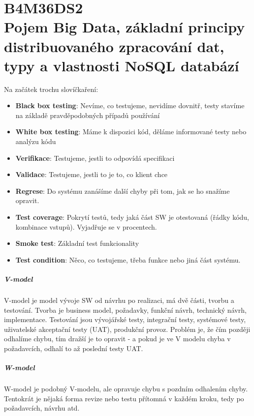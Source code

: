 \chapter[Databáze 2]{B4M36DS2 \\[1ex]\Large{Pojem Big Data, základní principy distribuovaného zpracování dat, typy a vlastnosti NoSQL databází}}

Na začátek trochu slovíčkaření:

\begin{itemize}
\item \textbf{Black box testing}: Nevíme, co testujeme, nevidíme dovnitř, testy stavíme na základě pravděpodobných případů používání
\item \textbf{White box testing}: Máme k dispozici kód, děláme informované testy nebo analýzu kódu
\item \textbf{Verifikace}: Testujeme, jestli to odpovídá specifikaci
\item \textbf{Validace}: Testujeme, jestli to je to, co klient chce
\item \textbf{Regrese}: Do systému zanášíme další chyby při tom, jak se ho snažíme opravit.
\item \textbf{Test coverage}: Pokrytí testů, tedy jaká část SW je otestovaná (řádky kódu, kombinace vstupů). Vyjadřuje se v procentech.
\item \textbf{Smoke test}: Základní test funkcionality
\item \textbf{Test condition}: Něco, co testujeme, třeba funkce nebo jiná část systému. 
\end{itemize}

\paragraph{V-model} V-model je model vývoje SW od návrhu po realizaci, má dvě části, tvorbu a testování. Tvorba je business model, požadavky, funkční návrh, technický návrh, implementace. Testování jsou vývojářské testy, integrační testy, systémové testy, uživatelské akceptační testy (UAT), produkční provoz. Problém je, že čím později odhalíme chybu, tím dražší je to opravit - a pokud je ve V modelu chyba v požadavcích, odhalí to až poslední testy UAT.

\paragraph{W-model} W-model je podobný V-modelu, ale opravuje chybu s pozdním odhalením chyby. Tentokrát je nějaká forma revize nebo testu přítomná v každém kroku, tedy po požadavcích, návrhu atd.

